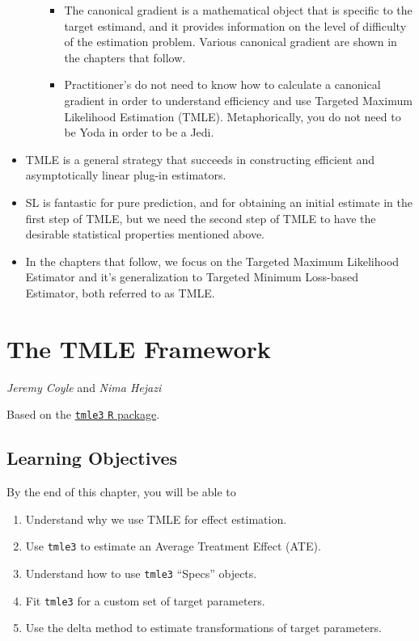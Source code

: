 \documentclass[
  12pt, krantz2,
]{book}
\newcommand{\passthrough}[1]{#1}
\providecommand{\tightlist}{%
  \setlength{\itemsep}{0pt}\setlength{\parskip}{0pt}}
\theoremstyle{definition}
\theoremstyle{definition}
\theoremstyle{definition}
\newcommand{\1}{\mathbbm{1}}
\begin{document}
\begin{itemize}
\begin{itemize}
    \begin{itemize}
    \tightlist
    \item
      The canonical gradient is a mathematical object that is specific to
      the target estimand, and it provides information on the level of
      difficulty of the estimation problem. Various canonical gradient are
      shown in the chapters that follow.
    \item
      Practitioner's do not need to know how to calculate a canonical
      gradient in order to understand efficiency and use Targeted Maximum
      Likelihood Estimation (TMLE). Metaphorically, you do not need to be
      Yoda in order to be a Jedi.
    \end{itemize}
  \end{itemize}
\item
  TMLE is a general strategy that succeeds in constructing efficient and
  asymptotically linear plug-in estimators.
\item
  SL is fantastic for pure prediction, and for obtaining an initial
  estimate in the first step of TMLE, but we need the second step of TMLE to
  have the desirable statistical properties mentioned above.
\item
  In the chapters that follow, we focus on the Targeted Maximum Likelihood
  Estimator and it's generalization to Targeted Minimum Loss-based Estimator,
  both referred to as TMLE.
\end{itemize}

\hypertarget{tmle3}{%
\chapter{The TMLE Framework}\label{tmle3}}

\emph{Jeremy Coyle} and \emph{Nima Hejazi}

Based on the \href{https://github.com/tlverse/tmle3}{\passthrough{\lstinline!tmle3!} \passthrough{\lstinline!R!} package}.

\hypertarget{learn-tmle}{%
\section{Learning Objectives}\label{learn-tmle}}

By the end of this chapter, you will be able to

\begin{enumerate}
\def\labelenumi{\arabic{enumi}.}
\tightlist
\item
  Understand why we use TMLE for effect estimation.
\item
  Use \passthrough{\lstinline!tmle3!} to estimate an Average Treatment Effect (ATE).
\item
  Understand how to use \passthrough{\lstinline!tmle3!} ``Specs'' objects.
\item
  Fit \passthrough{\lstinline!tmle3!} for a custom set of target parameters.
\item
  Use the delta method to estimate transformations of target parameters.
\end{enumerate}
\end{document}
